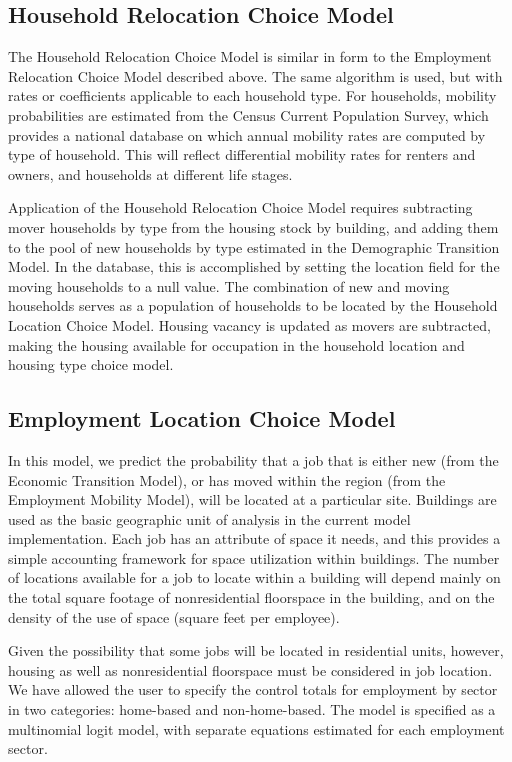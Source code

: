 \subsection{Household Relocation Choice Model}

The Household Relocation Choice Model is similar in form to the Employment
Relocation Choice Model described above.  The same algorithm is used, but
with rates or coefficients applicable to each household type.  For
households, mobility probabilities are estimated from the Census
Current Population Survey, which provides a national database on
which annual mobility rates are computed by type of household.
This will reflect differential mobility rates for renters and
owners, and households at different life stages.

Application of the Household Relocation Choice Model requires subtracting
mover households by type from the housing stock by building, and
adding them to the pool of new households by type estimated in the
Demographic Transition Model. In the database, this is
accomplished by setting the location field for the moving
households to a null value.  The combination of new and moving
households serves as a population of households to be located by
the Household Location Choice Model. Housing vacancy is updated as
movers are subtracted, making the housing available for occupation
in the household location and housing type choice model.


\subsection{Employment Location Choice Model}

In this model, we predict the probability that a job that is
either new (from the Economic Transition Model), or has moved
within the region (from the Employment Mobility Model), will be
located at a particular site.  Buildings are used as the basic
geographic unit of analysis in the current model implementation.
Each job has an attribute of space it needs, and this provides
a simple accounting framework for space utilization within
buildings. The
number of locations available for a job to locate within a building
will depend mainly on the total square footage of
nonresidential floorspace in the building, and on the density of the
use of space (square feet per employee).

Given the possibility
that some jobs will be located in residential units, however,
housing as well as nonresidential floorspace must be considered in
job location.  We have allowed the user to specify the control totals
for employment by sector in two categories: home-based and
non-home-based.  The model is specified as a multinomial logit model,
with separate equations estimated for each employment sector.


